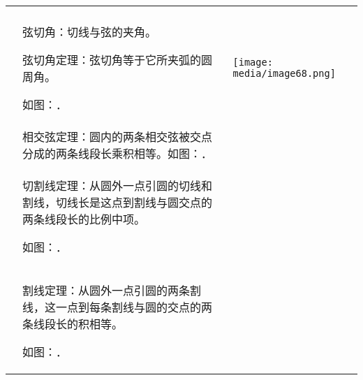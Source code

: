 \documentclass[a4paper,11pt,UTF8]{ctexart}
\begin{document}
\begin{longtable}[]{@{}lll@{}}
\toprule
\endhead
& &\tabularnewline
\begin{minipage}[t]{0.30\columnwidth}\raggedright
\strut
\end{minipage} & \begin{minipage}[t]{0.30\columnwidth}\raggedright
弦切角：切线与弦的夹角。

弦切角定理：弦切角等于它所夹弧的圆周角。

如图：．\strut
\end{minipage} & \begin{minipage}[t]{0.30\columnwidth}\raggedright
\texttt{[image: media/image68.png]}\strut
\end{minipage}\tabularnewline
& 相交弦定理：圆内的两条相交弦被交点分成的两条线段长乘积相等。如图：．
&\tabularnewline
\begin{minipage}[t]{0.30\columnwidth}\raggedright
\strut
\end{minipage} & \begin{minipage}[t]{0.30\columnwidth}\raggedright
切割线定理：从圆外一点引圆的切线和割线，切线长是这点到割线与圆交点的两条线段长的比例中项。

如图：．\strut
\end{minipage} & \begin{minipage}[t]{0.30\columnwidth}\raggedright
\strut
\end{minipage}\tabularnewline
\begin{minipage}[t]{0.30\columnwidth}\raggedright
\strut
\end{minipage} & \begin{minipage}[t]{0.30\columnwidth}\raggedright
割线定理：从圆外一点引圆的两条割线，这一点到每条割线与圆的交点的两条线段长的积相等。

如图：．\strut
\end{minipage} & \begin{minipage}[t]{0.30\columnwidth}\raggedright
\strut
\end{minipage}\tabularnewline
\bottomrule
\end{longtable}

\hypertarget{section-19}{%
\subsubsection{}\label{section-19}}
\end{document}
